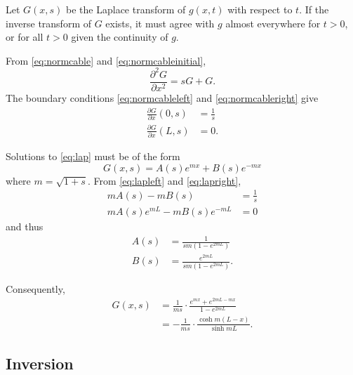 \documentclass[parskip=half]{scrartcl}
\begin{document}
Let $G(x, s)$ be the Laplace transform of $g(x, t)$ with respect to $t$.
If the inverse transform of $G$ exists, it must agree with $g$ almost everywhere
for $t>0$, or for all $t>0$ given the continuity of $g$.

From
\eqref{eq:normcable} and \eqref{eq:normcableinitial},
\begin{equation}
    \label{eq:lap}
    \frac{\partial^2 G}{\partial x^2} = sG + G.
\end{equation}
The boundary conditions \eqref{eq:normcableleft} and \eqref{eq:normcableright} give
\begin{align}
    \label{eq:lapleft}
    \frac{\partial G}{\partial x}(0, s) & = \frac{1}{s}
    \\
    \label{eq:lapright}
    \frac{\partial G}{\partial x}(L, s) & = 0.
\end{align}

Solutions to \eqref{eq:lap} must be of the form
\begin{equation}
    G(x, s) = A(s) e^{mx} +B(s) e^{-mx}
\end{equation}
where $m=\sqrt{1+s}$. From \eqref{eq:lapleft} and \eqref{eq:lapright},
\begin{align*}
    mA(s) - mB(s) & = \frac{1}{s}
    \\
    mA(s)e^{mL} -mB(s)e^{-mL} & = 0
\end{align*}
and thus
\begin{align*}
    A(s) & = \frac{1}{sm (1-e^{2mL})}
    \\
    B(s) & = \frac{e^{2mL}}{sm (1-e^{2mL})}.
\end{align*}

Consequently,
\begin{equation}
    \begin{aligned}
	G(x, s) &= \frac{1}{ms}\cdot\frac{e^{mx}+e^{2mL-mx}}{1-e^{2mL}}\\
                &= - \frac{1}{ms}\cdot\frac{\cosh m(L-x)}{\sinh mL}.
    \end{aligned}
\end{equation}

\subsection*{Inversion}
\end{document}
